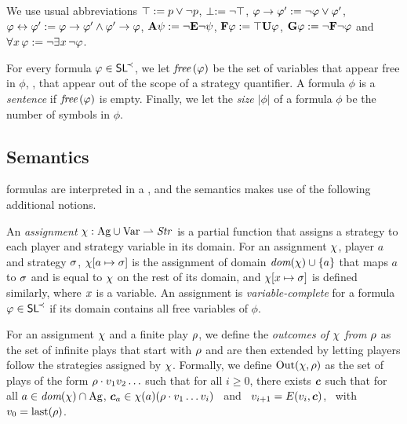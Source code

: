 We use usual abbreviations $\top:= p\vee\neg p$, $\perp:=\neg\top$, $\varphi\to\varphi':= \neg \varphi \vee \varphi'$,
$\varphi\leftrightarrow\varphi':= \varphi\to\varphi'\wedge \varphi'\to\varphi$,
${\bf A}\psi:= \neg {\bf E} \neg\psi$,
 ${\bf F}\varphi := \top {\bf U} \varphi$,   ${\bf G}\varphi := \neg {\bf F}
\neg \varphi$ and
 $\forall^{} x\,\varphi:=\neg\exists^{} x\,\neg\varphi$. %

For every formula $\varphi\in\textnormal{{\sffamily SL}}^{\!\prec}$, we let  $\textit{free}\,(\varphi)$ be the set of variables that appear
free in $\phi$, \ie, that
appear out of the scope of a strategy quantifier. A formula $\phi$ is a \emph{sentence} if $\textit{free}\,(\varphi)$ is empty.
Finally, we let the \emph{size} $|\phi|$ of a formula $\phi$ be the
number of symbols in $\phi$.


\subsection{Semantics}
\label{sec-SLmodels}

 \SLref formulas are interpreted in a \CGS, and the semantics makes
 use of the following additional notions.

An \emph{assignment}  $\chi:\textnormal{Ag}\cup\textnormal{Var} \rightharpoonup \mbox{\emph{Str}}$
is a partial function that assigns a strategy  to
each  player and strategy variable in its domain.
For an assignment
$\chi$, player $a$ and  strategy $\sigma$,
$\chi[a\mapsto\sigma]$ is the assignment of domain
$\textit{dom}(\chi)\cup\{a\}$ that maps $a$ to $\sigma$ and is equal to
$\chi$ on the rest of its domain, and 
$\chi[x\mapsto \sigma]$ is defined similarly, where $x$ is a
variable. %
An assignment is
\emph{variable-complete} for a formula $\varphi\in\textnormal{{\sffamily SL}}^{\!\prec}$ if
its domain contains all free variables of $\phi$.

For an assignment $\chi$ and a finite play $\rho$, we define the
\emph{outcomes of $\chi$ from $\rho$}
as the set of infinite plays that start with
$\rho$ and are then extended by letting players follow the strategies
assigned by $\chi$. Formally,
we define $\textnormal{Out}(\chi,\rho)$ as the set of plays of the form $\rho \cdot
 v_{1}v_{2}\ldots$ such that for all $i\geq 0$, there exists
 $\bm{c}$ such that for all $a\in\textit{dom}(\chi)\cap\textnormal{Ag}$,
 $\bm{c}_a\in\chi(a)(\rho\cdot v_{1}\ldots v_i)$ \mbox{ and }
 $v_{i+1}=E(v_{i},\bm{c})$, \mbox{ with }
 $v_{0}=\mbox{last}(\rho)$.
 


